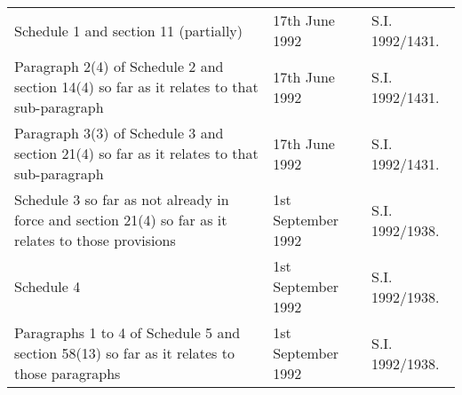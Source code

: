 \documentclass[a4paper]{article}
\begin{document}
\begin{longtable}{p{134pt}p{100pt}p{75pt}}
Schedule 1 and section 11 (partially)&17th June 1992&S.I. 1992/1431.\\
Paragraph 2(4) of Schedule 2 and section 14(4) so far as it relates to that sub-paragraph&17th June 1992&S.I. 1992/1431.\\
Paragraph 3(3) of Schedule 3 and section 21(4) so far as it relates to that sub-paragraph&17th June 1992&S.I. 1992/1431.\\
Schedule 3 so far as not already in force and section 21(4) so far as it relates to those provisions&1st September 1992&S.I. 1992/1938.\\
Schedule 4&1st September 1992&S.I. 1992/1938.\\
Paragraphs 1 to 4 of Schedule 5 and section 58(13) so far as it relates to those paragraphs&1st September 1992&S.I. 1992/1938.\\
\end{longtable}
\end{document}

